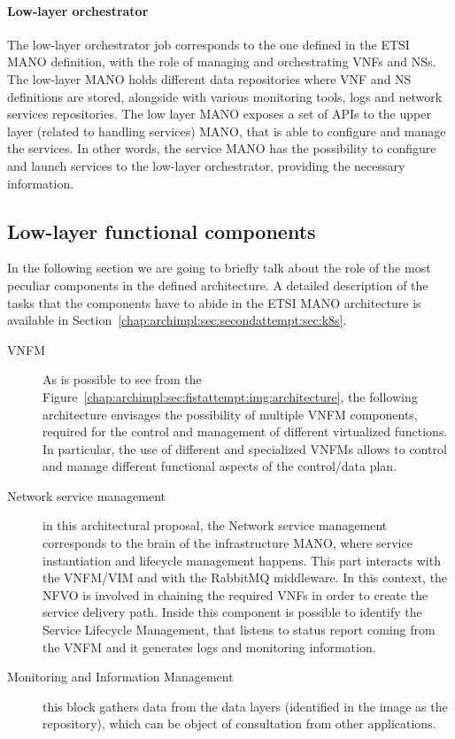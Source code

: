 \paragraph*{Low-layer orchestrator}
The low-layer orchestrator job corresponds to the one defined in the ETSI MANO
definition, with the role of managing and orchestrating VNFs and NSs. The
low-layer MANO holds different data repositories where VNF and NS definitions
are stored, alongside with various monitoring tools, logs and network services
repositories. The low layer MANO exposes a set of APIs to the upper layer
(related to handling services) MANO, that is able to configure and manage the
services. In other words, the service MANO has the possibility to configure and
launch services to the low-layer orchestrator, providing the necessary
information.

\subsection{Low-layer functional components}
In the following section we are going to briefly talk about the role of the most
peculiar components in the defined architecture. A detailed description of the
tasks that the components have to abide in the ETSI MANO architecture is
available in Section~\ref{chap:archimpl:sec:secondattempt:sec:k8s}.
\begin{description}
\item[VNFM] As is possible to see from the
  Figure~\ref{chap:archimpl:sec:fistattempt:img:architecture}, the following
  architecture envisages the possibility of multiple VNFM components, required
  for the control and management of different virtualized functions. In
  particular, the use of different and specialized VNFMs allows to control and
  manage different functional aspects of the control/data plan.
\item[Network service management] in this architectural proposal, the Network
  service management corresponds to the brain of the infrastructure MANO, where
  service instantiation and lifecycle management happens. This part interacts
  with the VNFM/VIM and with the RabbitMQ middleware. In this context, the NFVO
  is involved in chaining the required VNFs in order to create the service
  delivery path. Inside this component is possible to identify the Service
  Lifecycle Management, that listens to status report coming from the VNFM and
  it generates logs and monitoring information.
\item[Monitoring and Information Management] this block gathers data from the
  data layers (identified in the image as the repository), which can be object
  of consultation from other applications.
\end{description}

